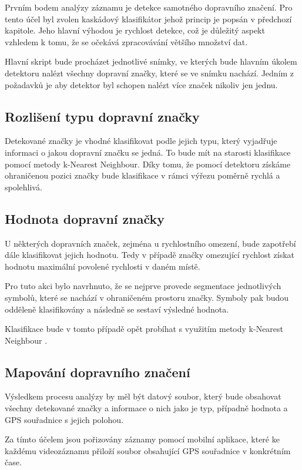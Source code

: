 \documentclass[czech]{ExcelAtFIT} %
\begin{document}
Prvním bodem analýzy záznamu je detekce samotného dopravního značení. Pro tento účel byl zvolen kaská\-dový klasifikátor jehož princip je popsán v předchozí kapitole. Jeho hlavní výhodou je rychlost detekce, což je důležitý aspekt vzhledem k tomu, že se očekává zpracovávání většího množství dat.

Hlavní skript bude procházet jednotlivé snímky, ve kterých bude hlavním úkolem detektoru nalézt všechny dopravní značky, které se ve snímku nachází. Jedním z požadavků je aby detektor byl schopen nalézt více značek nikoliv jen jednu.

\subsection{Rozlišení typu dopravní značky}

Detekované značky je vhodné klasifikovat podle jejich typu, který vyjadřuje informaci o jakou dopravní značku se jedná. To bude mít na starosti klasifikace pomocí metody k-Nearest Neighbour. Díky tomu, že pomocí detektoru získáme ohraničenou pozici značky bude klasifikace v rámci výřezu poměrně rychlá a spolehlivá.

\subsection{Hodnota dopravní značky}

U některých dopravních značek, zejména u rychlost\-ního omezení, bude zapotřebí dále klasifikovat jejich hodnotu. Tedy v případě značky omezující rychlost získat hodnotu maximální povolené rychlosti v daném místě. 

Pro tuto akci bylo navrhnuto, že se nejprve provede segmentace jednotlivých symbolů, které se nachází v ohraničeném prostoru značky. Symboly pak budou odděleně klasifikovány a následně se sestaví výsledné hodnota.

Klasifikace bude v tomto případě opět probíhat s využitím metody k-Nearest Neighbour \cite{opencv-knn}.


\subsection{Mapování dopravního značení}

Výsledkem procesu analýzy by měl být datový soubor, který bude obsahovat všechny detekované značky a informace o nich jako je typ, případně hodnota a GPS souřadnice s jejich polohou.

Za tímto účelem jsou pořizovány záznamy pomocí mobilní aplikace, které ke každému videozáznamu přiloží soubor obsahující GPS souřadnice v konkrétním čase.
\end{document}
